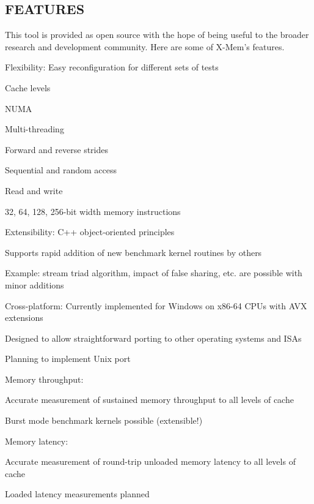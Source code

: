 \subsection*{F\-E\-A\-T\-U\-R\-E\-S }

This tool is provided as open source with the hope of being useful to the broader research and development community. Here are some of X-\/\-Mem's features.

Flexibility\-: Easy reconfiguration for different sets of tests
\begin{DoxyItemize}
\item Cache levels
\item N\-U\-M\-A
\item Multi-\/threading
\item Forward and reverse strides
\item Sequential and random access
\item Read and write
\item 32, 64, 128, 256-\/bit width memory instructions
\end{DoxyItemize}

Extensibility\-: C++ object-\/oriented principles
\begin{DoxyItemize}
\item Supports rapid addition of new benchmark kernel routines by others
\item Example\-: stream triad algorithm, impact of false sharing, etc. are possible with minor additions
\end{DoxyItemize}

Cross-\/platform\-: Currently implemented for Windows on x86-\/64 C\-P\-Us with A\-V\-X extensions
\begin{DoxyItemize}
\item Designed to allow straightforward porting to other operating systems and I\-S\-As
\item Planning to implement Unix port
\end{DoxyItemize}

Memory throughput\-:
\begin{DoxyItemize}
\item Accurate measurement of sustained memory throughput to all levels of cache
\item Burst mode benchmark kernels possible (extensible!)
\end{DoxyItemize}

Memory latency\-:
\begin{DoxyItemize}
\item Accurate measurement of round-\/trip unloaded memory latency to all levels of cache
\item Loaded latency measurements planned
\end{DoxyItemize}

